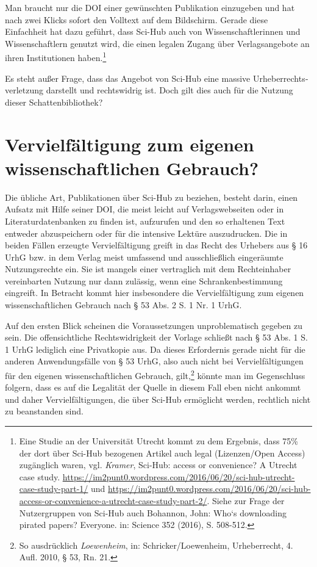 \documentclass[a4paper,
fontsize=11pt,
oneside,
numbers=noperiodatend,
parskip=half-,
bibliography=totoc,
final
]{scrartcl}
\begin{document}
Man braucht nur die DOI einer gewünschten Publikation einzugeben und hat
nach zwei Klicks sofort den Volltext auf dem Bildschirm. Gerade diese
Einfachheit hat dazu geführt, dass Sci-Hub auch von Wissenschaftlerinnen
und Wissenschaftlern genutzt wird, die einen legalen Zugang über
Verlagsangebote an ihren Institutionen haben.\footnote{Eine Studie an
  der Universität Utrecht kommt zu dem Ergebnis, dass 75\% der dort über
  Sci-Hub bezogenen Artikel auch legal (Lizenzen/Open Access) zugänglich
  waren, vgl. \emph{Kramer}, Sci-Hub: access or convenience? A Utrecht
  case study.
  \url{https://im2punt0.wordpress.com/2016/06/20/sci-hub-utrecht-case-study-part-1/}
  und
  \url{https://im2punt0.wordpress.com/2016/06/20/sci-hub-access-or-convenience-a-utrecht-case-study-part-2/}.
  Siehe zur Frage der Nutzergruppen von Sci-Hub auch Bohannon, John:
  Who`s downloading pirated papers? Everyone. in: Science 352 (2016), S.
  508-512.}

Es steht außer Frage, dass das Angebot von Sci-Hub eine massive
Urheberrechts­verletzung darstellt und rechtswidrig ist. Doch gilt dies
auch für die Nutzung dieser Schattenbibliothek?

\section{Vervielfältigung zum eigenen wissenschaftlichen
Gebrauch?}\label{vervielfuxe4ltigung-zum-eigenen-wissenschaftlichen-gebrauch}

Die übliche Art, Publikationen über Sci-Hub zu beziehen, besteht darin,
einen Aufsatz mit Hilfe seiner DOI, die meist leicht auf
Verlagswebseiten oder in Literatur­datenbanken zu finden ist, aufzurufen
und den so erhaltenen Text entweder abzu­speichern oder für die
intensive Lektüre auszudrucken. Die in beiden Fällen erzeugte
Vervielfältigung greift in das Recht des Urhebers aus § 16 UrhG bzw. in
dem Verlag meist umfassend und ausschließlich eingeräumte Nutzungsrechte
ein. Sie ist mangels einer vertraglich mit dem Rechteinhaber
vereinbarten Nutzung nur dann zulässig, wenn eine Schrankenbestimmung
eingreift. In Betracht kommt hier insbesondere die Vervielfältigung zum
eigenen wissenschaftlichen Gebrauch nach § 53 Abs. 2 S. 1 Nr. 1 UrhG.

Auf den ersten Blick scheinen die Voraussetzungen unproblematisch
gegeben zu sein. Die offensichtliche Rechtswidrigkeit der Vorlage
schließt nach § 53 Abs. 1 S. 1 UrhG lediglich eine Privatkopie aus. Da
dieses Erfordernis gerade nicht für die anderen Anwendungsfälle von § 53
UrhG, also auch nicht bei Vervielfältigungen für den eigenen
wissenschaftlichen Gebrauch, gilt,\footnote{So ausdrücklich
  \emph{Loewenheim}, in: Schricker/Loewenheim, Urheberrecht, 4. Aufl.
  2010, § 53, Rn. 21.} könnte man im Gegenschluss folgern, dass es auf
die Legalität der Quelle in diesem Fall eben nicht ankommt und daher
Vervielfältigungen, die über Sci-Hub ermöglicht werden, rechtlich nicht
zu bean­standen sind.
\end{document}
